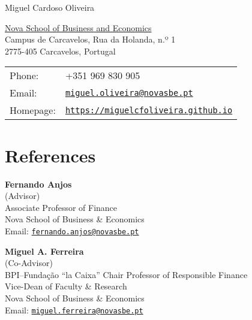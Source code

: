 \documentclass[letterpaper]{article}
\def\name{Miguel Cardoso Oliveira}
\begin{document}
\begin{center}
{\huge \name}
\end{center}

\vspace{0.1in}

\begin{minipage}{0.45\linewidth}
  \href{https://www.novasbe.unl.pt/en/}{Nova School of Business and Economics} \\
  Campus de Carcavelos, Rua da Holanda, n.º 1 \\ 
  2775-405 Carcavelos, Portugal 
\end{minipage}
\begin{minipage}{0.45\linewidth}
  \begin{tabular}{ll}
    Phone: & +351 969 830 905 \\
    Email: & \href{mailto:miguel.oliveira@novasbe.pt}{\tt miguel.oliveira@novasbe.pt} \\
    Homepage: & \href{https://miguelcfoliveira.github.io}{\tt https://miguelcfoliveira.github.io} 
  \end{tabular}
\end{minipage}


\section*{References}
\vspace{-0.2in}
\hrulefill
\begin{multicols}{2}
\textbf{Fernando Anjos} \\
(Advisor) \\
Associate Professor of Finance \\
Nova School of Business \& Economics \\
Email: \href{mailto:fernando.anjos@novasbe.pt}{\tt fernando.anjos@novasbe.pt} 
\columnbreak \hfill

\textbf{Miguel A. Ferreira} \\
(Co-Advisor) \\
BPI--Fundação “la Caixa” Chair Professor of Responsible Finance \\ 
Vice-Dean of Faculty \& Research \\
Nova School of Business \& Economics \\
Email: \href{mailto:miguel.ferreira@novasbe.pt}{\tt miguel.ferreira@novasbe.pt} 
\end{multicols}
\end{document}
